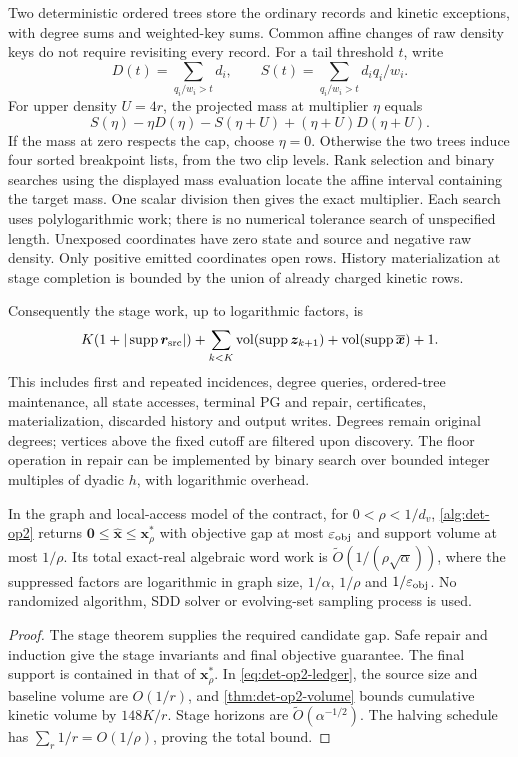 Two deterministic ordered trees store the ordinary records and kinetic
exceptions, with degree sums and weighted-key sums. Common affine changes
of raw density keys do not require revisiting every record. For a tail
threshold $t$, write
\[
 D(t)=\sum_{q_i/w_i>t}d_i,\qquad
 S(t)=\sum_{q_i/w_i>t}d_i q_i/w_i.
\]
For upper density $U=4r$, the projected mass at multiplier $\eta$ equals
\[
 S(\eta)-\eta D(\eta)
       -S(\eta+U)+(\eta+U)D(\eta+U).
\]
If the mass at zero respects the cap, choose $\eta=0$. Otherwise the two
trees induce four sorted breakpoint lists, from the two clip levels.
Rank selection and binary searches using the displayed mass evaluation
locate the affine interval containing the target mass. One scalar division
then gives the exact multiplier. Each search uses polylogarithmic work;
there is no numerical tolerance search of unspecified length.
Unexposed coordinates have zero state and source and negative raw density.
Only positive emitted coordinates open rows. History materialization at
stage completion is bounded by the union of already charged kinetic rows.

Consequently the stage work, up to logarithmic factors, is
\begin{equation}\label{eq:det-op2-ledger}
 K(1+|\operatorname{supp}\bm{r}_{\mathrm{src}}|)
 +\sum_{k<K}\operatorname{vol}(\operatorname{supp}\bm{z}_{k+1})
 +\operatorname{vol}(\operatorname{supp}\overline{\bm{x}})+1.
\end{equation}
This includes first and repeated incidences, degree queries, ordered-tree
maintenance, all state accesses, terminal PG and repair, certificates,
materialization, discarded history and output writes. Degrees remain original
degrees; vertices above the fixed cutoff are filtered upon discovery.
The floor operation in repair can be implemented by binary search over
bounded integer multiples of dyadic $h$, with logarithmic overhead.

\begin{theorem}
\label{thm:det-op2-total}
In the graph and local-access model of the contract, for
$0<\rho<1/d_v$, \cref{alg:det-op2} returns
$\bm{0}\leq\widehat{\bm{x}}\leq\bm{x}_\rho^*$ with objective gap at most
$\varepsilon_{\mathrm{obj}}$ and support volume at most $1/\rho$. Its total exact-real
algebraic word work is
$\widetilde O(1/(\rho\sqrt\alpha))$, where the suppressed factors are
logarithmic in graph size, $1/\alpha$, $1/\rho$ and $1/\varepsilon_{\mathrm{obj}}$.
No randomized algorithm, SDD solver or evolving-set sampling process is used.
\end{theorem}
\begin{proof}
The stage theorem supplies the required candidate gap. Safe repair and
induction give the stage invariants and final objective guarantee.
The final support is contained in that of $\bm{x}_\rho^*$.
In \eqref{eq:det-op2-ledger}, the source size and baseline volume are
$O(1/r)$, and \cref{thm:det-op2-volume} bounds cumulative kinetic volume
by $148K/r$. Stage horizons are
$\widetilde O(\alpha^{-1/2})$. The halving schedule has
$\sum_r1/r=O(1/\rho)$, proving the total bound.
\end{proof}

